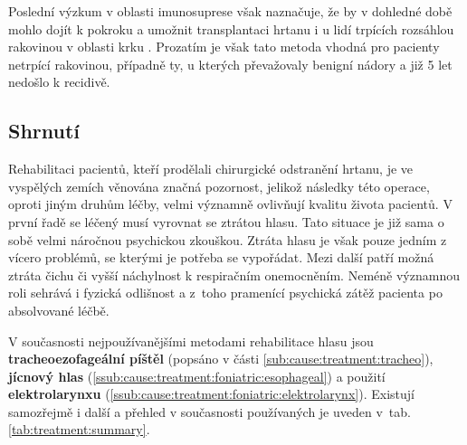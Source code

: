 Poslední výzkum v oblasti imunosuprese však naznačuje, že by v dohledné době
mohlo dojít k pokroku a umožnit transplantaci hrtanu i u lidí trpících
rozsáhlou rakovinou v oblasti krku \cite{Narula2011}. Prozatím je však tato
metoda vhodná pro pacienty netrpící rakovinou, případně ty, u kterých
převažovaly benigní nádory a již 5 let nedošlo k recidivě.


\subsection{Shrnutí} %


Rehabilitaci pacientů, kteří prodělali chirurgické odstranění hrtanu, je ve
vyspělých zemích věnována značná pozornost, jelikož následky této operace,
oproti jiným druhům léčby, velmi významně ovlivňují kvalitu života pacientů. V
první řadě se léčený musí vyrovnat se ztrátou hlasu. Tato situace je již sama
o sobě velmi náročnou psychickou zkouškou. Ztráta hlasu je však pouze jedním z
vícero problémů, se kterými je potřeba se vypořádat. Mezi další patří možná
ztráta čichu či vyšší náchylnost k respiračním onemocněním. Neméně významnou
roli sehrává i fyzická odlišnost a z~toho pramenící psychická zátěž pacienta
po absolvované léčbě.

 V současnosti
nejpoužívanějšími metodami rehabilitace hlasu jsou \textbf{tracheoezofageální
píštěl} (popsáno v části \ref{sub:cause:treatment:tracheo}), \textbf{jícnový
hlas} (\ref{ssub:cause:treatment:foniatric:esophageal}) a použití
\textbf{elektrolarynxu} (\ref{ssub:cause:treatment:foniatric:elektrolarynx}).
Existují samozřejmě i další a přehled v současnosti používaných je uveden
v~tab. \ref{tab:treatment:summary}.

\newcolumntype{b}{X}

